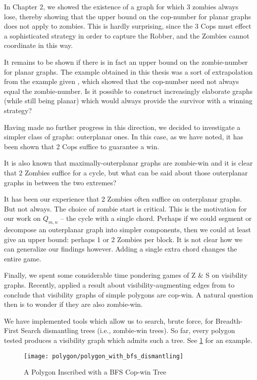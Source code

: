 In Chapter 2, we showed the existence of a graph for which 3 zombies always lose,
thereby showing that the upper bound on the cop-number for planar graphs does not
apply to zombies. This is hardly surprising, since the 3 Cops must effect a sophisticated
strategy in order to capture the Robber, and the Zombies cannot coordinate in this way.

It remains to be shown if there is in fact an upper bound on the zombie-number for
 planar graphs. The example obtained in this thesis was a sort of extrapolation from
 the example given \cite{fitzpatrick2016deterministic}, which showed that
 the cop-number need not always equal the zombie-number. Is it possible to construct
 increasingly elaborate graphs (while still being planar) which would always provide
 the survivor with a winning strategy?

 Having made no further progress in this direction, we decided to investigate a simpler
 class of graphs: outerplanar ones. In this case, as we have noted, it has been shown
 \cite{clarke2002constrained} that 2 Cops suffice to guarantee a win.

 It is also known that maximally-outerplanar graphs are zombie-win \cite{fitzpatrick2016deterministic}
 and it is clear that 2 Zombies suffice for a cycle, but what can be said about those
 outerplanar graphs in between the two extremes?

 It has been our experience that 2 Zombies often suffice on outerplanar graphs. But
 not always. The choice of zombie start is critical. This is the
 motivation for our work on $Q_{m,n}$ -- the cycle with a single chord. Perhaps if we
 could segment or decompose an outerplanar graph into simpler components, then we could at least give an upper bound: perhaps 1 or 2 Zombies per block. It is not clear how we can
 generalize our findings however. Adding a single extra chord changes the entire game.

 Finally, we spent some considerable time pondering games of Z \& S on visibility graphs.
 Recently, \cite{lubiw2017visibility} applied a result about visibility-augmenting edges from \cite{aichholzer2011convexifying} to conclude that visibility graphs of simple polygons
 are cop-win. A natural question then is to wonder if they are also zombie-win.

We have implemented tools which allow us to search, brute force, for Breadth-First Search
dismantling trees (i.e., zombie-win trees). So far, every polygon tested produces a visibility
graph which admits such a tree. See \ref{fig:polygon_with_bfs_dismantling} for an example.

\begin{figure}
  \centering
  \texttt{[image: polygon/polygon\_with\_bfs\_dismantling]}
  \caption{A Polygon Inscribed with a BFS Cop-win Tree \label{fig:polygon_with_bfs_dismantling}}
\end{figure}

